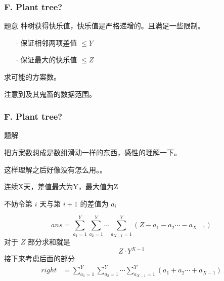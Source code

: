 \renewcommand{\problemname}{F. Plant tree?}

\begin{frame}\frametitle{\problemname}

    \begin{block}{题意}
        种树获得快乐值，快乐值是严格递增的。且满足一些限制。
		\begin{itemize}
			\item[$\cdot$] 保证相邻两项差值 $\le Y$
			\item[$\cdot$] 保证最大的快乐值 $\le Z$
		\end{itemize}
		求可能的方案数。
    \end{block}

    \pause

注意到及其鬼畜的数据范围。

\end{frame}

\begin{frame}\frametitle{\problemname}
	
	\begin{block}{题解}
		{
			\small
		把方案数想成是数组滑动一样的东西，感性的理解一下。

		这样理解之后好像没有怎么用。。

		连续X天，差值最大为Y，最大值为Z

        不妨令第 $i$ 天与第 $i+1$ 的差值为 $a_i$	

		$$ans=\sum_{a_1=1}^Y\sum_{a_2=1}^Y\cdots\sum_{a_{X-1}=1}^Y(Z-a_1-a_2\cdots-a_{X-1})$$
		对于 $Z$ 部分求和就是
		$$Z\cdot Y^{X-1}$$
		接下来考虑后面的部分
		$$
		\begin{aligned}
		right&=\sum_{a_1=1}^Y\sum_{a_2=1}^Y\cdots\sum_{a_{X-1}=1}^Y(a_1+a_2\cdots+a_{X-1})\\
		\end{aligned}
		$$
		}
	\end{block}
\end{frame}


